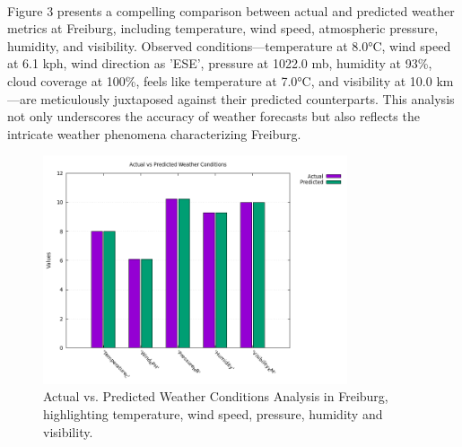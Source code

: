 \documentclass[11pt]{article}
\begin{document}
\paragraph{}Figure 3 presents a compelling comparison between actual and predicted weather metrics at Freiburg, including temperature, wind speed, atmospheric pressure, humidity, and visibility. Observed conditions—temperature at 8.0°C, wind speed at 6.1 kph, wind direction as 'ESE', pressure at 1022.0 mb, humidity at 93\%, cloud coverage at 100\%, feels like temperature at 7.0°C, and visibility at 10.0 km—are meticulously juxtaposed against their predicted counterparts. This analysis not only underscores the accuracy of weather forecasts but also reflects the intricate weather phenomena characterizing Freiburg.
\begin{figure}[h]
\centering
\includegraphics[width=0.8\textwidth]{data/graph/weather_comparison_graph.png}
\caption{Actual vs. Predicted Weather Conditions Analysis in Freiburg, highlighting temperature, wind speed, pressure, humidity and visibility.}
\end{figure}
\end{document}
